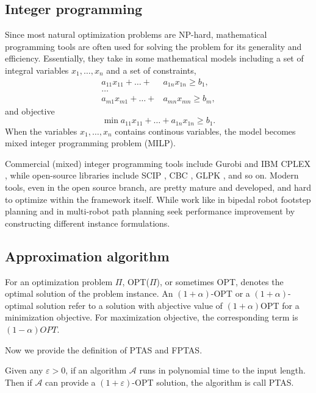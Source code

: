 \subsection{Integer programming}
Since most natural optimization problems are NP-hard, mathematical programming tools are often 
used for solving the problem for its generality and efficiency. Essentially, they take in
some mathematical models including a set of integral variables $x_1, \dots, x_n$ and a set of constraints,
\begin{align*}
    a_{11} x_{11} + \dots + & a_{1n} x_{1n} \geq b_1,\\
    \dots & \\
    a_{m1} x_{m1} + \dots + & a_{mn} x_{mn} \geq b_m,
\end{align*}
and objective 
\[
    \min a_{11} x_{11} + \dots + a_{1n} x_{1n} \geq b_1.
\]
When the variables $x_1, \dots, x_n$ contains continous variables, the model becomes mixed integer programming problem (MILP).

Commercial (mixed) integer programming tools include Gurobi \cite{optimization2019gurobi} and IBM CPLEX \cite{cplex2009v12}, while open-source 
libraries include SCIP \cite{achterberg2009scip}, CBC \cite{forrest2005cbc}, GLPK \cite{makhorin2008glpk}, and so on. 
Modern tools, even in the open source branch, are pretty mature and developed, and hard to optimize within the framework itself. 
While work like \cite{deits2014footstep} in bipedal robot footstep planning and \cite{guo2021spatial} in multi-robot path planning 
seek performance improvement by constructing different instance formulations.

\subsection{Approximation algorithm}
For an optimization problem $\Pi$, OPT($\Pi$), or sometimes OPT, 
denotes the optimal solution of the problem instance. An $(1+\alpha)$-OPT or a $(1+\alpha)$-optimal solution refer
to a solution with abjective value of $(1+\alpha)$OPT for a minimization objective. For maximization objective,
the corresponding term is $(1-\alpha)OPT$.

Now we provide the definition of PTAS and FPTAS.
\begin{definition}
    Given any $\varepsilon>0$, if an algorithm $\mathcal A$ runs in polynomial time to the input length. 
    Then if $\mathcal A$ can provide a $(1+\varepsilon)$-OPT solution, the algorithm is call PTAS.
\end{definition}

